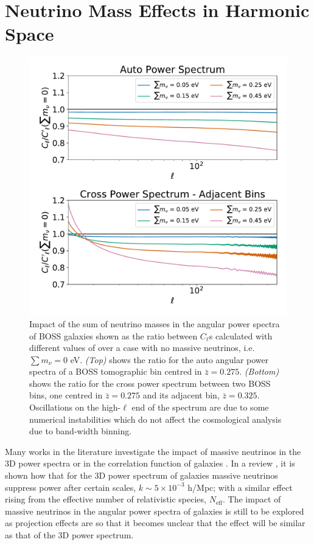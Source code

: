 \section{Neutrino Mass Effects in Harmonic Space}
\begin{figure}
\begin{center}
\includegraphics[scale=0.50]{Neutrino-FIGS/Neutrinos_SumMnu.pdf}
\caption[Impact of the sum of neutrino masses in the angular power spectra of galaxies.]{Impact of the sum of neutrino masses in the angular power spectra of BOSS galaxies shown as the ratio between $C_{\ell}$s calculated with different values of \NM{} over a case with no massive neutrinos, i.e. $\sum m_{\nu} = 0$ eV. \textit{(Top)} shows the ratio for the auto angular power spectra of a BOSS tomographic bin centred in $\bar{z} = 0.275$. \textit{(Bottom)} shows the ratio for the cross power spectrum between two BOSS bins, one centred in $\bar{z} = 0.275$ and its adjacent bin, $\bar{z} = 0.325$. Oscillations on the high-$\ell$ end of the spectrum are due to some numerical instabilities which do not affect the cosmological analysis due to band-width binning.}
\label{fig:neutrinoCompareSumM}
\end{center}
\end{figure}
Many works in the literature investigate the impact of massive neutrinos in the 3D power spectra or in the correlation function of galaxies \citep{2007FBA,2012Julien-Deg,Bird2012}. In a review \cite{2006NeutrinoReview}, it is shown how that for the 3D power spectrum of galaxies massive neutrinos suppress power after certain scales, $k \sim 5\times 10^{-3}$ h/Mpc; with a similar effect rising from the effective number of relativistic species, $N_{\text{eff}}$. The impact of massive neutrinos in the angular power spectra of galaxies is still to be explored as projection effects are so that it becomes unclear that the effect will be similar as that of the 3D power spectrum.

